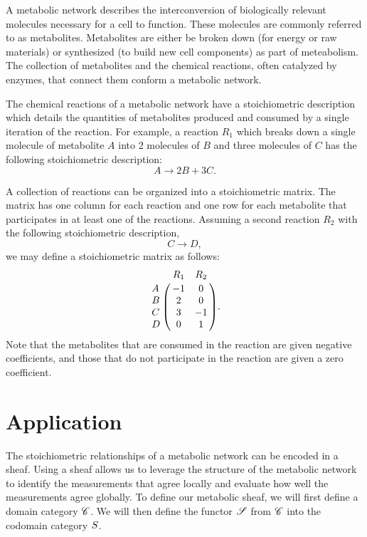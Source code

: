 \documentclass{article}
\begin{document}
 A metabolic network describes the
interconversion of biologically relevant molecules necessary for a cell to
function. These molecules are commonly referred to as metabolites. Metabolites
are either be broken down (for energy or raw materials) or synthesized (to
build new cell components) as part of meteabolism. The collection of
metabolites and the chemical reactions, often catalyzed by enzymes, that
connect them conform a metabolic network.

 The chemical reactions of a metabolic
network have a stoichiometric description which details the quantities of
metabolites produced and consumed by a single iteration of the reaction. For
example, a reaction $R_1$ which breaks down a single molecule of metabolite $A$
into 2 molecules of $B$ and three molecules of $C$ has the following
stoichiometric description:
\begin{equation} 
 A \rightarrow 2 B + 3 C.
\end{equation}

A collection of reactions can be organized into a stoichiometric matrix.  The
matrix has one column for each reaction and one row for each metabolite that
participates in at least one of the reactions. Assuming a second reaction $R_2$
with the following stoichiometric description,
\begin{equation}
C \rightarrow D,
\end{equation}
we may define a stoichiometric matrix as follows:
\begin{equation} 
\bordermatrix{
~ & R_1 & R_2 \cr
A & -1  & 0  \cr
B & 2   & 0 \cr
C & 3   & -1 \cr
D & 0   & 1 
}.
\end{equation}
Note that the metabolites that are consumed in the reaction are given negative
coefficients, and those that do not participate in the reaction are given a
zero coefficient.

\section{Application}
\label{application}

The stoichiometric relationships of a metabolic network can be encoded in a
sheaf. Using a sheaf allows us to leverage the structure of the metabolic
network to identify the measurements that agree locally and evaluate how well
the measurements agree globally. To define our metabolic sheaf, we will first
define a domain category $\mathscr{C}$. We will then define the functor $\mathscr{S}$
from $\mathscr{C}$ into the codomain category $S$.
\end{document}
